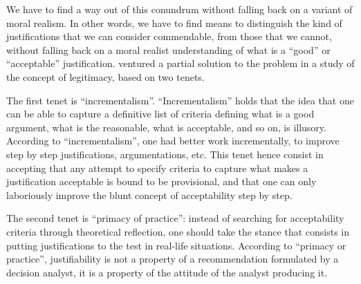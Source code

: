 \documentclass[preprint,11pt]{elsarticle}
\newcommand{\commentOC}[1]{\textcolor{red}{OC: #1}}
\begin{document}

 
 
 
 
We have to find a way out of this conundrum without falling back on a variant of moral realism. In other words, we have to find means to distinguish the kind of justifications that we can consider commendable, from those that we cannot, without falling back on a moral realist understanding of what is a ``good'' or ``acceptable'' justification. \cite{meinard_what_2017} ventured a partial solution to the problem in a study of the concept of legitimacy, based on two tenets.

The first tenet is ``incrementalism''. ``Incrementalism'' holds that the idea that one can be able to capture a definitive list of criteria defining what is a good argument, what is the reasonable, what is acceptable, and so on, is illusory. According to ``incrementalism'', one had better work incrementally, to improve step by step justifications, argumentations, etc. This tenet hence consist in accepting that any attempt to specify criteria to capture what makes a justification acceptable is bound to be provisional, and that one can only laboriously improve the blunt concept of acceptability step by step.

The second tenet is ``primacy of practice'': instead of searching for acceptability criteria through theoretical reflection, one should take the stance that consists in putting justifications to the test in real-life situations. According to ``primacy or practice'', justifiability is not a property of a recommendation formulated by a decision analyst, it is a property of the attitude of the analyst producing it.
\end{document}
